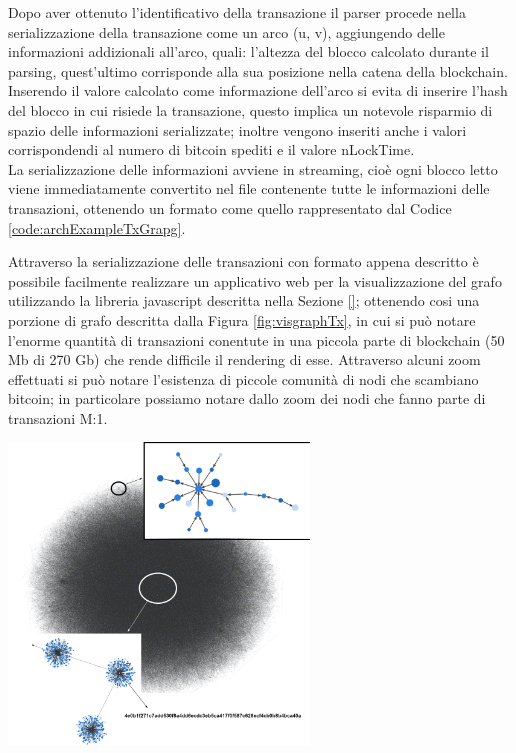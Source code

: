 \begin{example}
Dopo aver ottenuto l'identificativo della transazione il parser procede nella serializzazione della transazione come un arco (u, v), aggiungendo delle informazioni addizionali all'arco, quali: l'altezza del blocco calcolato durante il parsing, quest'ultimo corrisponde alla sua posizione nella catena della blockchain.
Inserendo il valore calcolato come informazione dell'arco si evita di inserire l'hash del blocco in cui risiede la transazione, questo implica un notevole risparmio di spazio delle informazioni serializzate; inoltre vengono inseriti anche i valori corrispondendi al numero di bitcoin spediti e il valore nLockTime.\\
La serializzazione delle informazioni avviene in streaming, cioè ogni blocco letto viene immediatamente convertito nel file contenente tutte le informazioni delle transazioni, ottenendo un formato come quello rappresentato dal Codice \ref{code:archExampleTxGrapg}.\\



\end{example}

Attraverso la serializzazione delle transazioni con formato appena descritto è possibile facilmente realizzare un applicativo web per la visualizzazione del grafo utilizzando la libreria javascript descritta nella Sezione \ref{}; ottenendo cosi una porzione di grafo descritta dalla Figura \ref{fig:visgraphTx}, in cui si può notare l'enorme quantità di transazioni conentute in una piccola parte di blockchain (50 Mb di 270 Gb) che rende difficile il rendering di esse.
Attraverso alcuni zoom effettuati si può notare l'esistenza di piccole comunità di nodi che scambiano bitcoin; in particolare possiamo notare dallo zoom  dei nodi che fanno parte di transazioni M:1.
\newpage
{\centering
\vspace{15pt}
\includegraphics[width=80mm, scale=0.5]{images/demo/graph_tx_demo_presentation.png}
\vspace{10pt}
\par}

